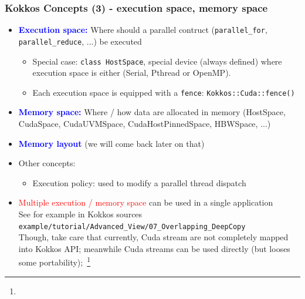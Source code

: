 \begin{frame}
  \frametitle{Kokkos Concepts (3) - execution space, memory space}

  \begin{itemize}
  \item \textcolor{blue}{\textbf{Execution space:}} Where should a parallel contruct (\texttt{parallel\_for}, \texttt{parallel\_reduce}, ...) be executed\\
    \begin{itemize}
    \item Special case: \texttt{class HostSpace}, special device (always defined) where execution space is either (Serial, Pthread or OpenMP).
    \item Each execution space is equipped with a \texttt{fence}: \texttt{Kokkos::Cuda::fence()}
    \end{itemize}
  \item \textcolor{blue}{\textbf{Memory space:}} Where / how data are allocated in memory (HostSpace, CudaSpace, CudaUVMSpace, CudaHostPinnedSpace, HBWSpace, ...)
  \item \textcolor{blue}{\textbf{Memory layout}} (we will come back later on that)
  \item Other concepts:
    \begin{itemize}
    \item Execution policy: used to modify a parallel thread dispatch
    \end{itemize}
  \item \textcolor{red}{Multiple execution / memory space} can be used in a single application\\
    See for example in Kokkos sources \texttt{example/tutorial/Advanced\_View/07\_Overlapping\_DeepCopy}\\
    Though, take care that currently, Cuda stream are not completely mapped into Kokkos API; meanwhile Cuda streams can be used directly (but looses some portability);~\footnote{} 
  \end{itemize}

\end{frame}

